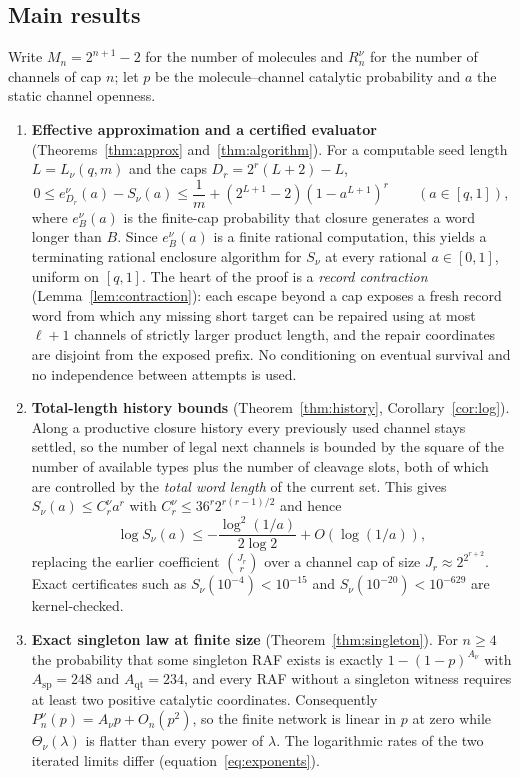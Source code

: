 \documentclass[11pt,a4paper]{article}
\theoremstyle{plain}
\theoremstyle{definition}
\theoremstyle{remark}
\newcommand{\qt}{\mathrm{qt}}
\newcommand{\spc}{\mathrm{sp}}
\begin{document}
\subsection*{Main results}
Write $M_n=2^{n+1}-2$ for the number of molecules and $R_n^\nu$ for the number of channels of cap $n$; let $p$ be the molecule--channel catalytic probability and $a$ the static channel openness.

\begin{enumerate}[label=\textbf{(\Alph*)},leftmargin=2.6em]
\item \textbf{Effective approximation and a certified evaluator} (Theorems~\ref{thm:approx} and~\ref{thm:algorithm}). For a computable seed length $L=L_\nu(q,m)$ and the caps $D_r=2^r(L+2)-L$,
\[
0\le e^\nu_{D_r}(a)-S_\nu(a)\le\frac1m+(2^{L+1}-2)(1-a^{L+1})^r\qquad(a\in[q,1]),
\]
where $e^\nu_B(a)$ is the finite-cap probability that closure generates a word longer than $B$. Since $e^\nu_B(a)$ is a finite rational computation, this yields a terminating rational enclosure algorithm for $S_\nu$ at every rational $a\in[0,1]$, uniform on $[q,1]$. The heart of the proof is a \emph{record contraction} (Lemma~\ref{lem:contraction}): each escape beyond a cap exposes a fresh record word from which any missing short target can be repaired using at most $\ell+1$ channels of strictly larger product length, and the repair coordinates are disjoint from the exposed prefix. No conditioning on eventual survival and no independence between attempts is used.
\item \textbf{Total-length history bounds} (Theorem~\ref{thm:history}, Corollary~\ref{cor:log}). Along a productive closure history every previously used channel stays settled, so the number of legal next channels is bounded by the square of the number of available types plus the number of cleavage slots, both of which are controlled by the \emph{total word length} of the current set. This gives $S_\nu(a)\le C_r^\nu a^r$ with $C_r^\nu\le36^r2^{r(r-1)/2}$ and hence
\[
\log S_\nu(a)\le-\frac{\log^2(1/a)}{2\log2}+O(\log(1/a)),
\]
replacing the earlier coefficient $\binom{J_r}{r}$ over a channel cap of size $J_r\approx 2^{2^{r+2}}$. Exact certificates such as $S_\nu(10^{-4})<10^{-15}$ and $S_\nu(10^{-20})<10^{-629}$ are kernel-checked.
\item \textbf{Exact singleton law at finite size} (Theorem~\ref{thm:singleton}). For $n\ge4$ the probability that some singleton RAF exists is exactly $1-(1-p)^{A_\nu}$ with $A_{\spc}=248$ and $A_{\qt}=234$, and every RAF without a singleton witness requires at least two positive catalytic coordinates. Consequently $P^\nu_n(p)=A_\nu p+O_n(p^2)$, so the finite network is linear in $p$ at zero while $\Theta_\nu(\lambda)$ is flatter than every power of $\lambda$. The logarithmic rates of the two iterated limits differ (equation~\eqref{eq:exponents}).

\end{enumerate}
\end{document}
